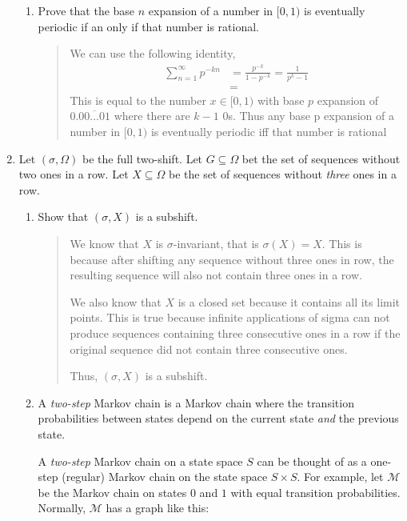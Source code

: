 \documentclass[letter]{article}
\begin{document}
\begin{enumerate}
\begin{enumerate}
			\item Prove that the base $n$ expansion of a number in $[0,1)$ is eventually periodic if an only if that
				number is rational.
			\begin{quote}
			    We can use the following identity,
			    \begin{align*}
			        \sum_{n=1}^\infty p^{-kn}
			        &= \frac{p^{-k}}{1-p^{-k}}
			        =\frac{1}{p^k-1}\\
			        &= 
			    \end{align*}
			    This is equal to the number $x \in [0,1)$ with base $p$ expansion of $0.\overline{00\dots01}$ where there are $k-1$ $0$s. Thus any base p expansion of a number in $[0,1)$ is eventually periodic iff that number is rational
			\end{quote}
		\end{enumerate}

        \newpage
		\item Let $(\sigma, \Omega)$ be the full two-shift. Let $G\subseteq\Omega$ 
			bet the set of sequences without two ones in a row.
			Let $X\subseteq \Omega$ be the set of sequences without \emph{three} ones in a row.
			\begin{enumerate}
				\item Show that $(\sigma, X)$ is a subshift.
			    \begin{quote}
			        We know that $X$ is $\sigma$-invariant, that is $\sigma(X) = X$. This is because after shifting any sequence without three ones in row, the resulting sequence will also not contain three ones in a row.
			        
			        We also know that $X$ is a closed set because it contains all its limit points. This is true because infinite applications of sigma can not produce sequences containing three consecutive ones in a row if the original sequence did not contain three consecutive ones.
			        
			        Thus, $(\sigma, X)$ is a subshift.
			    \end{quote}

				\item A \emph{two-step} Markov chain is a Markov chain where the transition probabilities
					between states depend on the current state \emph{and} the previous state. 
					
					A \emph{two-step} Markov chain on a state space $S$ can be thought of as a 
					one-step (regular) Markov chain on the state space $S\times S$. For example, let
					$\mathcal M$ be the Markov
					chain on states $0$ and $1$ with equal transition probabilities.
					Normally, $\mathcal M$ has a graph like this:


\end{enumerate}
\end{enumerate}
\end{document}
